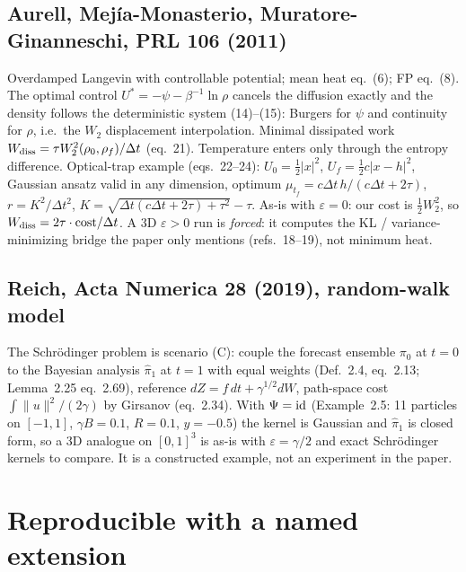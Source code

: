 \documentclass[11pt]{article}
\newcommand{\eps}{\varepsilon}
\begin{document}
\subsection{Aurell, Mej\'ia-Monasterio, Muratore-Ginanneschi, PRL 106 (2011)}
Overdamped Langevin with controllable potential; mean heat eq.~(6); FP eq.~(8). The optimal control $U^\ast=-\psi-\beta^{-1}\ln\rho$ cancels the diffusion exactly and the density follows the deterministic system (14)--(15): Burgers for $\psi$ and continuity for $\rho$, i.e.\ the $W_2$ displacement interpolation. Minimal dissipated work $W_{\rm diss}=\tau W_2^2(\rho_0,\rho_f)/\Delta t$ (eq.~21). Temperature enters only through the entropy difference. Optical-trap example (eqs.~22--24): $U_0=\tfrac12|x|^2$, $U_f=\tfrac12c|x-h|^2$, Gaussian ansatz valid in any dimension, optimum $\mu_{t_f}=c\Delta t\,h/(c\Delta t+2\tau)$, $r=K^2/\Delta t^2$, $K=\sqrt{\Delta t(c\Delta t+2\tau)+\tau^2}-\tau$. As-is with $\eps=0$: our cost is $\tfrac12W_2^2$, so $W_{\rm diss}=2\tau\cdot{\rm cost}/\Delta t$. A 3D $\eps>0$ run is \emph{forced}: it computes the KL / variance-minimizing bridge the paper only mentions (refs.\ 18--19), not minimum heat.

\subsection{Reich, Acta Numerica 28 (2019), random-walk model}
The Schr\"odinger problem is scenario (C): couple the forecast ensemble $\pi_0$ at $t=0$ to the Bayesian analysis $\hat\pi_1$ at $t=1$ with equal weights (Def.~2.4, eq.~2.13; Lemma~2.25 eq.~2.69), reference $dZ=f\,dt+\gamma^{1/2}dW$, path-space cost $\int\|u\|^2/(2\gamma)$ by Girsanov (eq.~2.34). With $\Psi={\rm id}$ (Example~2.5: 11 particles on $[-1,1]$, $\gamma B=0.1$, $R=0.1$, $y=-0.5$) the kernel is Gaussian and $\hat\pi_1$ is closed form, so a 3D analogue on $[0,1]^3$ is as-is with $\eps=\gamma/2$ and exact Schr\"odinger kernels to compare. It is a constructed example, not an experiment in the paper.

\section{Reproducible with a named extension}
\label{sec:ext}
\end{document}
